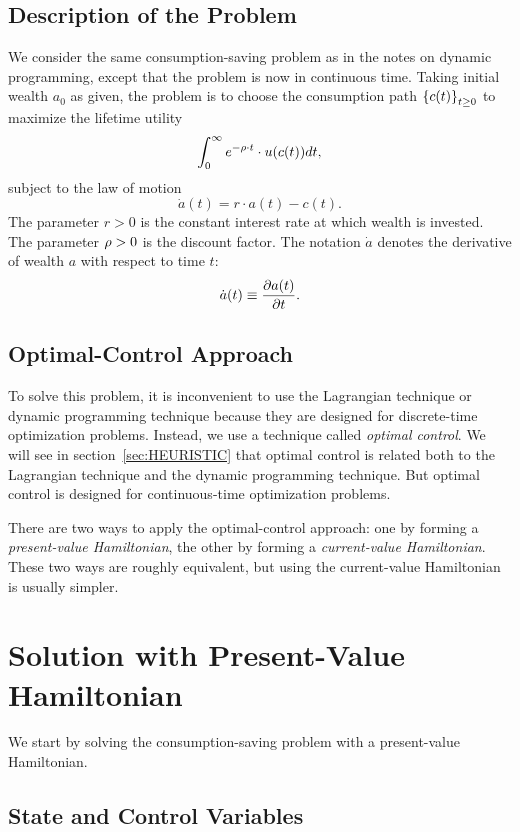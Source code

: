 \documentclass[letterpaper,12pt,leqno]{article}
\begin{document}
\subsection{Description of the Problem}

We consider the same consumption-saving problem as in the notes on dynamic programming, except that the problem is now in continuous time. Taking initial wealth $a_{0}$ as given, the problem is to choose the consumption path $\left\lbrace c(t) \right\rbrace_{t\geq 0}$ to maximize the lifetime utility
\begin{align}
\int_{0}^{\infty}e^{-\rho \cdot t}\cdot u(c(t)) dt \label{eq:cont},
\end{align}
subject to the law of motion
\begin{equation}
\dot{a}(t) = r\cdot a(t)-c(t).\label{eq:LAW}
\end{equation}  
The parameter $r>0$ is the constant interest rate at which wealth is invested. The parameter $\rho>0$ is the discount factor. The notation $\dot{a}$ denotes the derivative of wealth $a$ with respect to time $t$:
\[\dot{a}(t)\equiv \frac{\partial a(t)}{\partial t}.\] 

\subsection{Optimal-Control Approach}

To solve this problem, it is inconvenient to use the Lagrangian technique or dynamic programming technique because they are designed for discrete-time optimization problems. Instead, we use a technique called \textit{optimal control}. We will see in section~\ref{sec:HEURISTIC} that optimal control is related both to the Lagrangian technique and the dynamic programming technique. But optimal control is designed for continuous-time optimization problems. 

There are two ways to apply the optimal-control approach: one by forming a \textit{present-value Hamiltonian}, the other by forming a \textit{current-value Hamiltonian}. These two ways are roughly equivalent, but using the current-value Hamiltonian is usually simpler.

\section{Solution with Present-Value Hamiltonian}

We start by solving the consumption-saving problem with a present-value Hamiltonian.

\subsection{State and Control Variables}
\end{document}

